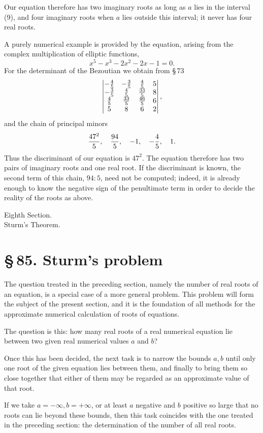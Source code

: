 \documentclass[11pt]{article}
\providecommand{\sect}[2]{\section*{\S\,#1. #2}}
\begin{document}
Our equation therefore has two imaginary roots as long as $a$ lies in the interval (9), and four imaginary roots when $a$ lies outside this interval; it never has four real roots.

A purely numerical example is provided by the equation, arising from the complex multiplication of elliptic functions,
\[
        x^5-x^3-2x^2-2x-1=0.
\]
For the determinant of the Bezoutian we obtain from \S\,73
\[
\begin{vmatrix}
 -\frac45&-\frac35&\frac45&5\cr
 -\frac35&\frac45&\frac{33}{5}&8\cr
 \frac45&\frac{33}{5}&\frac{46}{5}&6\cr
 5&8&6&2
\end{vmatrix},
\]
and the chain of principal minors
\[
        {47^2\over5},
        \quad {94\over5},
        \quad -1,
        \quad -{4\over5},
        \quad 1.
\]
Thus the discriminant of our equation is $47^2$. The equation therefore has two pairs of imaginary roots and one real root. If the discriminant is known, the second term of this chain, $94:5$, need not be computed; indeed, it is already enough to know the negative sign of the penultimate term in order to decide the reality of the roots as above.

\clearpage
\begin{center}
{\large Eighth Section.}\\[0.6em]
{\Large Sturm's Theorem.}
\end{center}

\sect{85}{Sturm's problem}

The question treated in the preceding section, namely the number of real roots of an equation, is a special case of a more general problem. This problem will form the subject of the present section, and it is the foundation of all methods for the approximate numerical calculation of roots of equations.

The question is this: how many real roots of a real numerical equation lie between two given real numerical values $a$ and $b$?

Once this has been decided, the next task is to narrow the bounds $a,b$ until only one root of the given equation lies between them, and finally to bring them so close together that either of them may be regarded as an approximate value of that root.

If we take $a=-\infty,b=+\infty$, or at least $a$ negative and $b$ positive so large that no roots can lie beyond these bounds, then this task coincides with the one treated in the preceding section: the determination of the number of all real roots.
\end{document}
